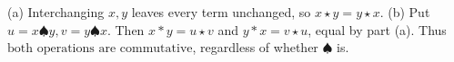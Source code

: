 (a) Interchanging $x,y$ leaves every term unchanged, so $x\star y=y\star x$. (b) Put $u=x\spadesuit y,v=y\spadesuit x$. Then $x*y=u\star v$ and $y*x=v\star u$, equal by part (a). Thus $\boxed{\text{both operations are commutative}}$, regardless of whether $\spadesuit$ is.
